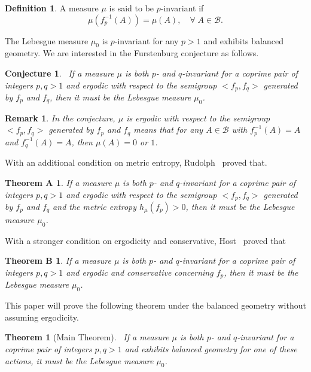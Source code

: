\documentclass[11pt]{amsart}
\newtheorem*{starthma}{Theorem A}
\newtheorem*{starthmb}{Theorem B}
\newtheorem{theorem}{Theorem}
\newtheorem{remark}{Remark}
\newtheorem{conjecture}{Conjecture}
\theoremstyle{definition}
\newtheorem{definition}{Definition}
\def\m{\mu}
\def\B{\mathcal{B}}
\begin{document}
\medskip
\begin{definition}
A measure $\m$ is said to be $p$-invariant if
$$
\m( f^{-1}_{p}(A)) =\m (A), \quad \forall\;A\in \B.
$$
\end{definition}

The Lebesgue measure $\m_{0}$ is $p$-invariant for any $p>1$ and exhibits balanced geometry. We are interested in the Furstenburg conjecture as follows.

\medskip
\begin{conjecture}~\label{fcc}
If a measure $\m$ is both $p$- and $q$-invariant for a coprime pair of integers $p, q>1$ and {\em ergodic} with respect to the semigroup $<f_{p}, f_{q}>$ generated by $f_{p}$ and $f_{q}$, then it must be the Lebesgue measure $\mu_{0}$.
\end{conjecture} 

\medskip
\begin{remark} 
In the conjecture, $\mu$ is ergodic with respect to the semigroup $<f_{p}, f_{q}>$ generated by $f_{p}$ and $f_{q}$ means that for any $A\in \mathcal{B}$ with $f_{p}^{-1}(A)=A$ and $f_{q}^{-1}(A) =A$, then $\mu (A)=0$ or $1$.
\end{remark}

With an additional condition on metric entropy, Rudolph~\cite{R} proved that. 


\begin{starthma} 
If a measure $\m$ is both $p$- and $q$-invariant for a coprime pair of integers $p, q>1$ and {\em ergodic} with respect to the semigroup $<f_{p}, f_{q}>$ generated by $f_{p}$ and $f_{q}$ and the metric entropy $h_{\mu}(f_{p})>0$, then it must be the Lebesgue measure $\mu_{0}$.
\end{starthma}

With a stronger condition on ergodicity and conservative, Host~\cite{H} proved that 


\begin{starthmb} 
If a measure $\m$ is both $p$- and $q$-invariant for a coprime pair of integers $p, q>1$ and {\em ergodic} and {\em conservative} concerning $f_{p}$, then it must be the Lebesgue measure $\mu_{0}$.
\end{starthmb}

This paper will prove the following theorem under the balanced geometry without assuming ergodicity. 

\medskip
\begin{theorem}[Main Theorem]~\label{main}
If a measure $\m$ is both $p$- and $q$-invariant for a coprime pair of integers $p, q>1$ and exhibits balanced geometry for one of these actions, it must be the Lebesgue measure $\mu_{0}$.
\end{theorem} 
\end{document}
